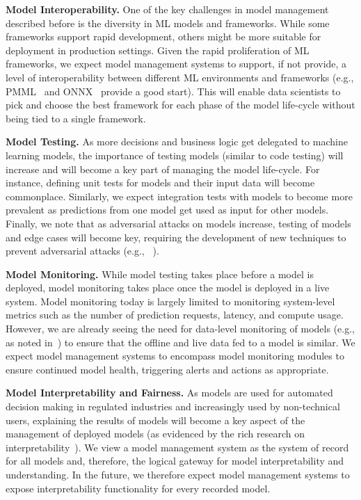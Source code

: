 \documentclass[11pt]{article}
\newcommand{\dss}{data scientists\xspace}
\begin{document}
{\bf Model Interoperability.} One of the key challenges in model management described before is the diversity in ML models and frameworks.
While some frameworks support rapid development, others might be more suitable for deployment in production settings.
Given the rapid proliferation of ML frameworks, we expect model management systems to support, if not provide, a level of interoperability between different ML environments and frameworks (e.g., PMML~\cite{pmml} and ONNX~\cite{onnx} provide a good start).
This will enable \dss to pick and choose the best framework for each phase of the model life-cycle without being tied to a single framework.

{\bf Model Testing.} As more decisions and business logic get delegated to machine learning models, the importance of testing models (similar to code testing) will increase and will become a key part of managing the model life-cycle.
For instance, defining unit tests for models and their input data will become commonplace.
Similarly, we expect integration tests with models to become more prevalent as predictions from one model get used as input for other models.
Finally, we note that as adversarial attacks on models increase, testing of models and edge cases will become key, requiring the development of new techniques to prevent adversarial attacks (e.g., ~\cite{adversarialICLR2015,feinman2017detectAdversarial}). 

{\bf Model Monitoring.} While model testing takes place before a model is deployed, model monitoring takes place once the model is deployed in a live system.
Model monitoring today is largely limited to monitoring system-level metrics such as the number of prediction requests, latency, and compute usage.
However, we are already seeing the need for data-level monitoring of models (e.g., as noted in~\cite{sculley2014high-interest-cc}) to ensure that the offline and live data fed to a model is similar.
We expect model management systems to encompass model monitoring modules to ensure continued model health, triggering alerts and actions as appropriate.

{\bf Model Interpretability and Fairness.} 
As models are used for automated decision making in regulated industries and increasingly used by non-technical users, explaining the results of models will become a key aspect of the management of deployed models (as evidenced by the rich research on interpretability~\cite{shap,DoshiKim2017Interpretability,svcca}).
We view a model management system as the system of record for all models and, therefore, the logical gateway for model interpretability and understanding.
In the future, we therefore expect model management systems to expose interpretability functionality for every recorded model.
\end{document}
